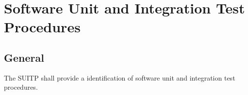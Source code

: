 
\chapter{Software Unit and Integration Test Procedures}

\section{General}
The SUITP shall provide a identification of software unit and integration test procedures.